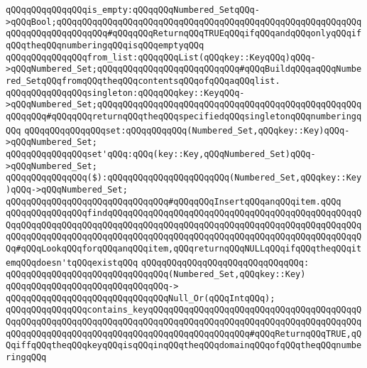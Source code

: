 \newline
\verb|qQQqqQQqqQQqqQQqis_empty:qQQqqQQqNumbered_SetqQQq->qQQqBool;qQQqqQQqqQQqqQQqqQQqqQQqqQQqqQQqqQQqqQQqqQQqqQQqqQQqqQQqqQQqqQQqqQQqqQQqqQQqqQQq#qQQqqQQqReturnqQQqTRUEqQQqifqQQqandqQQqonlyqQQqifqQQqtheqQQqnumberingqQQqisqQQqemptyqQQq|\newline
\newline
\verb|qQQqqQQqqQQqqQQqfrom_list:qQQqqQQqList(qQQqkey::KeyqQQq)qQQq->qQQqNumbered_Set;qQQqqQQqqQQqqQQqqQQqqQQqqQQq#qQQqBuildqQQqaqQQqNumbered_SetqQQqfromqQQqtheqQQqcontentsqQQqofqQQqaqQQqlist.|\newline
\verb|qQQqqQQqqQQqqQQqsingleton:qQQqqQQqkey::KeyqQQq->qQQqNumbered_Set;qQQqqQQqqQQqqQQqqQQqqQQqqQQqqQQqqQQqqQQqqQQqqQQqqQQqqQQqqQQq#qQQqqQQqreturnqQQqtheqQQqspecifiedqQQqsingletonqQQqnumberingqQQq|\newline
\newline
\verb|qQQqqQQqqQQqqQQqset:qQQqqQQqqQQq(Numbered_Set,qQQqkey::Key)qQQq->qQQqNumbered_Set;|\newline
\verb|qQQqqQQqqQQqqQQqset'qQQq:qQQq(key::Key,qQQqNumbered_Set)qQQq->qQQqNumbered_Set;|\newline
\verb|qQQqqQQqqQQqqQQq($):qQQqqQQqqQQqqQQqqQQqqQQq(Numbered_Set,qQQqkey::Key)qQQq->qQQqNumbered_Set;|\newline
\verb|qQQqqQQqqQQqqQQqqQQqqQQqqQQqqQQq#qQQqqQQqInsertqQQqanqQQqitem.qQQq|\newline
\newline
\verb|qQQqqQQqqQQqqQQqfindqQQqqQQqqQQqqQQqqQQqqQQqqQQqqQQqqQQqqQQqqQQqqQQqqQQqqQQqqQQqqQQqqQQqqQQqqQQqqQQqqQQqqQQqqQQqqQQqqQQqqQQqqQQqqQQqqQQqqQQqqQQqqQQqqQQqqQQqqQQqqQQqqQQqqQQqqQQqqQQqqQQqqQQqqQQqqQQqqQQqqQQqqQQqqQQq#qQQqLookqQQqforqQQqanqQQqitem,qQQqreturnqQQqNULLqQQqifqQQqtheqQQqitemqQQqdoesn'tqQQqexistqQQq|\newline
\verb|qQQqqQQqqQQqqQQqqQQqqQQqqQQqqQQq:|\newline
\verb|qQQqqQQqqQQqqQQqqQQqqQQqqQQqqQQq(Numbered_Set,qQQqkey::Key)|\newline
\verb|qQQqqQQqqQQqqQQqqQQqqQQqqQQqqQQq->|\newline
\verb|qQQqqQQqqQQqqQQqqQQqqQQqqQQqqQQqNull_Or(qQQqIntqQQq);|\newline
\newline
\verb|qQQqqQQqqQQqqQQqcontains_keyqQQqqQQqqQQqqQQqqQQqqQQqqQQqqQQqqQQqqQQqqQQqqQQqqQQqqQQqqQQqqQQqqQQqqQQqqQQqqQQqqQQqqQQqqQQqqQQqqQQqqQQqqQQqqQQqqQQqqQQqqQQqqQQqqQQqqQQqqQQqqQQqqQQqqQQqqQQqqQQq#qQQqReturnqQQqTRUE,qQQqiffqQQqtheqQQqkeyqQQqisqQQqinqQQqtheqQQqdomainqQQqofqQQqtheqQQqnumberingqQQq|\newline

